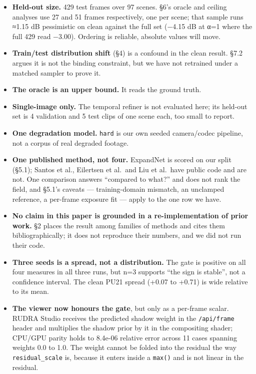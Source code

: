 \begin{itemize}
\tightlist
\item
  \textbf{Held-out size.} 429 test frames over 97 scenes. §6's oracle and ceiling
  analyses use 27 and 51 frames respectively, one per scene; that sample runs
  ≈1.15 dB pessimistic on clean against the full set (−4.15 dB at α=1 where the
  full 429 read −3.00). Ordering is reliable, absolute values will move.
\item
  \textbf{Train/test distribution shift} (§4) is a confound in the clean result. §7.2
  argues it is not the binding constraint, but we have not retrained under a
  matched sampler to prove it.
\item
  \textbf{The oracle is an upper bound.} It reads the ground truth.
\item
  \textbf{Single-image only.} The temporal refiner is not evaluated here; its
  held-out set is 4 validation and 5 test clips of one scene each, too small to
  report.
\item
  \textbf{One degradation model.} \texttt{hard} is our own seeded camera/codec pipeline, not
  a corpus of real degraded footage.
\item
  \textbf{One published method, not four.} ExpandNet is scored on our split (§5.1);
  Santos et al., Eilertsen et al.~and Liu et al.~have public code and are not.
  One comparison answers ``compared to what?'' and does not rank the field, and
  §5.1's caveats --- training-domain mismatch, an unclamped reference, a per-frame
  exposure fit --- apply to the one row we have.
\item
  \textbf{No claim in this paper is grounded in a re-implementation of prior work.}
  §2 places the result among families of methods and cites them
  bibliographically; it does not reproduce their numbers, and we did not run
  their code.
\item
  \textbf{Three seeds is a spread, not a distribution.} The gate is positive on all
  four measures in all three runs, but n=3 supports ``the sign is stable'', not a
  confidence interval. The clean PU21 spread (+0.07 to +0.71) is wide relative
  to its mean.
\item
  \textbf{The viewer now honours the gate}, but only as a per-frame scalar. RUDRA
  Studio receives the predicted shadow weight in the \texttt{/api/frame} header and
  multiplies the shadow prior by it in the compositing shader; CPU/GPU parity
  holds to 8.4e-06 relative error across 11 cases spanning weights 0.0 to 1.0.
  The weight cannot be folded into the residual the way \texttt{residual\_scale} is,
  because it enters inside a \texttt{max()} and is not linear in the residual.
\end{itemize}

